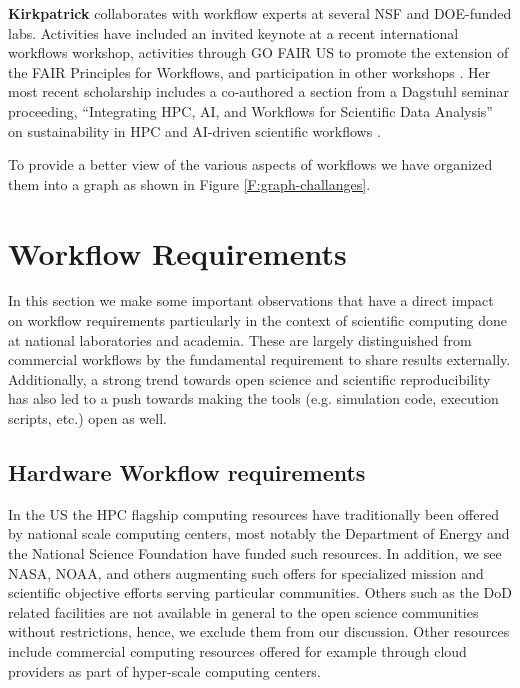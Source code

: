 \documentclass[utf8]{FrontiersinVancouver} %
\begin{document}
{\bf Kirkpatrick} collaborates with workflow experts at several NSF and DOE-funded labs. Activities have included an invited keynote at a recent international workflows workshop, activities through GO FAIR US to promote the extension of the FAIR Principles for Workflows, and participation in other workshops \cite{kirkpatrick2023}. Her most recent scholarship includes a co-authored a section from a Dagstuhl seminar proceeding, ``Integrating HPC, AI, and Workflows for Scientific Data Analysis'' on sustainability in HPC and AI-driven scientific workflows \citep{badia2024integrating}.

To provide a better view of the various aspects of workflows we have organized them into a graph as shown in Figure \ref{F:graph-challanges}.




\section{Workflow Requirements}

In this section we make some important observations that have a direct impact on workflow requirements particularly in the context of scientific computing done at national laboratories and academia. These are largely distinguished from commercial workflows by the fundamental requirement to share results externally. Additionally, a strong trend towards open science and scientific reproducibility has also led to a push towards making the tools (e.g. simulation code, execution scripts, etc.) open as well.  

\subsection{Hardware Workflow requirements}\label{sec:hw-requirements}

In the US the HPC flagship computing resources have traditionally been offered by national scale computing centers, most notably the Department of Energy and the National Science Foundation have funded such resources. In addition, we see NASA, NOAA, and others augmenting such offers for specialized mission and scientific objective efforts serving particular communities. Others such as the DoD related facilities are not available in general to the open science communities without restrictions, hence, we exclude them from our discussion. Other resources include commercial computing resources offered for example through cloud
providers as part of hyper-scale computing centers.
\end{document}
